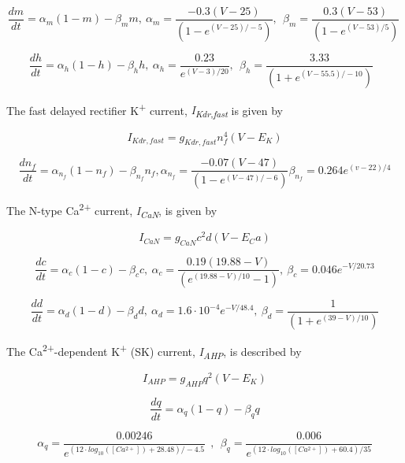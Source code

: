 \documentclass[a4paper]{article}
\begin{document}
\begin{equation}
\frac{dm}{dt}=α_m(1-m)-β_mm, \ 
α_m=\frac{-0.3(V-25)}{(1-e^{(V-25)/-5})}, \ \  β_m=\frac{0.3(V-53)}{(1-e^{(V-53)/5})} \ 
\end{equation}

\begin{equation}
\frac{dh}{dt}=α_h(1-h)-β_hh, \ 
α_h=\frac{0.23}{e^{(V-3)/20}}, \ \  β_h=\frac{3.33}{(1+e^{(V-55.5)/-10})}\ \ \ 
\end{equation}


The fast delayed rectifier K\textsuperscript{+} current, \textit{I}\textit{\textsubscript{Kdr,fast}} is given by\ \ 


\begin{equation}
I_{Kdr, fast}=g_{Kdr, fast}n_f^4(V-E_K)
\end{equation}

\begin{equation}
\frac{dn_f}{dt}=α_{n_f}(1-n_f)-β_{n_f}n_f , 
α_{n_f}=\frac{-0.07(V-47)}{(1-e^{(V-47)/-6})}  β_{n_f}=0.264e^{(v-22)/4}
\end{equation}


The N-type Ca\textsuperscript{2+} current, \textit{I}\textit{\textsubscript{CaN}}, is given by


\begin{equation}
I_{CaN}=g_{CaN}c^2d(V-E_Ca)
\end{equation}

\begin{equation}
\frac{dc}{dt}=α_c(1-c)-β_cc , \ 
α_c=\frac{0.19(19.88-V)}{(e^{(19.88-V)/10}-1)}, \  β_c=0.046e^{-V/20.73}
\end{equation}

\begin{equation}
\frac{dd}{dt} = α_d(1-d)-β_dd , \ α_d=1.6\cdot
10^{-4}e^{-V/48.4} , \  β_d=\frac 1{(1+e^{(39-V)/10})}
\end{equation}


The Ca\textsuperscript{2+}-dependent K\textsuperscript{+} (SK) current, \textit{I}\textit{\textsubscript{AHP}}, is
described by


\begin{equation}
I_{AHP} = g_{AHP} q^2 (V-E_K)
\end{equation}

\begin{equation}
\frac{dq}{dt}=α_q(1-q)-β_qq
\end{equation}

\begin{equation}
α_q=\frac{0.00246}{e^{(12\cdot log_{10}([Ca^{2+}])+28.48)/-4.5}} \ \ ,\ \ 
β_q=\frac{0.006}{e^{(12\cdot log_{10}([Ca^{2+}])+60.4)/35}}
\end{equation}
\end{document}
